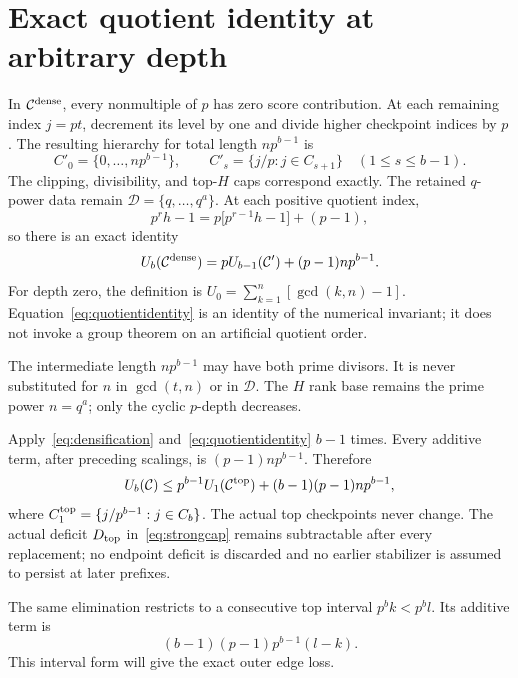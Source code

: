 \documentclass[11pt,letterpaper]{article}
\theoremstyle{definition}\newtheorem{definition}{Definition}
\newcommand{\D}{\mathcal D}
\newcommand{\C}{\mathcal C}
\begin{document}
\section{Exact quotient identity at arbitrary depth}\label{sec:quotient}
In $\C^{\rm dense}$, every nonmultiple of $p$ has zero score contribution. At each remaining index $j=pt$, decrement its level by one and divide higher checkpoint indices by $p$. The resulting hierarchy for total length $np^{b-1}$ is
\begin{equation}
C'_0=\{0,\ldots,np^{b-1}\},\qquad
C'_s=\{j/p:j\in C_{s+1}\}\quad(1\le s\le b-1).\label{eq:quotient}
\end{equation}
The clipping, divisibility, and top-$H$ caps correspond exactly. The retained $q$-power data remain $\D=\{q,\ldots,q^a\}$. At each positive quotient index,
\[
p^rh-1=p\bigl[p^{r-1}h-1\bigr]+(p-1),
\]
so there is an exact identity
\begin{equation}
U_b(\C^{\rm dense})=pU_{b-1}(\C')+(p-1)np^{b-1}.\label{eq:quotientidentity}
\end{equation}
For depth zero, the definition is $U_0=\sum_{k=1}^{n}[\gcd(k,n)-1]$. Equation~\eqref{eq:quotientidentity} is an identity of the numerical invariant; it does not invoke a group theorem on an artificial quotient order.

The intermediate length $np^{b-1}$ may have both prime divisors. It is never substituted for $n$ in $\gcd(t,n)$ or in $\D$. The $H$ rank base remains the prime power $n=q^a$; only the cyclic $p$-depth decreases.

Apply~\eqref{eq:densification} and~\eqref{eq:quotientidentity} $b-1$ times. Every additive term, after preceding scalings, is $(p-1)np^{b-1}$. Therefore
\begin{equation}
U_b(\C)\le p^{b-1}U_1(\C^{\rm top})+(b-1)(p-1)np^{b-1},\label{eq:collapse}
\end{equation}
where $C^{\rm top}_1=\{j/p^{b-1}:j\in C_b\}$. The actual top checkpoints never change. The actual deficit $D_{\rm top}$ in~\eqref{eq:strongcap} remains subtractable after every replacement; no endpoint deficit is discarded and no earlier stabilizer is assumed to persist at later prefixes.

The same elimination restricts to a consecutive top interval $p^bk<p^bl$. Its additive term is
\[
(b-1)(p-1)p^{b-1}(l-k).
\]
This interval form will give the exact outer edge loss.
\end{document}
